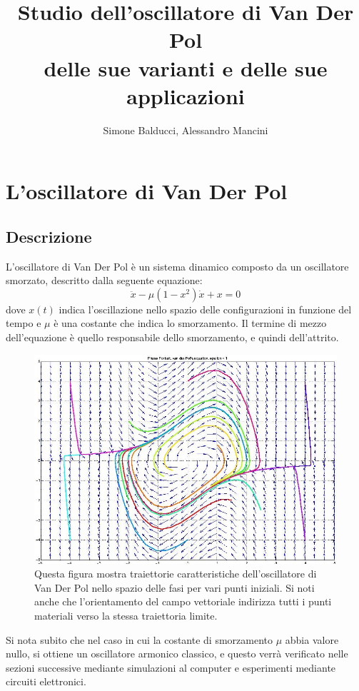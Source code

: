 \documentclass[12pt]{article}
\title{Studio dell'oscillatore di Van Der Pol \\
	delle sue varianti e delle sue applicazioni}
\author{Simone Balducci, Alessandro Mancini}
\date{}
\begin{document}
\maketitle 
\section{L'oscillatore di Van Der Pol}
\subsection{Descrizione}
L'oscillatore di Van Der Pol è un sistema dinamico composto da un oscillatore smorzato, descritto dalla seguente equazione:
\begin{equation}
	\ddot{x} - \mu(1-x^2)\dot{x} + x = 0
\end{equation}
dove $x(t)$ indica l'oscillazione nello spazio delle configurazioni in funzione del tempo e $\mu$ è una costante che indica lo smorzamento. Il termine di mezzo dell'equazione è quello responsabile dello smorzamento, e quindi dell'attrito. 
\begin{figure}[h]
	\centering
	\includegraphics[scale=.4]{Spazio delle fasi oscillatore} 
	\caption{Questa figura mostra traiettorie caratteristiche dell'oscillatore di Van Der Pol nello spazio delle fasi per vari punti iniziali. Si noti anche che l'orientamento del campo vettoriale indirizza tutti i punti materiali verso la stessa traiettoria limite.}
\end{figure}
Si nota subito che nel caso in cui la costante di smorzamento $\mu$ abbia valore nullo, si ottiene un oscillatore armonico classico, e questo verrà verificato nelle sezioni successive mediante simulazioni al computer e esperimenti mediante circuiti elettronici. 
\end{document}

